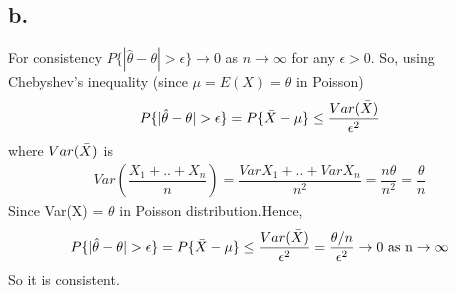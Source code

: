 \documentclass[12pt]{article}
\begin{document}
\subsection*{b.}
For consistency $P\{|\hat{\theta}-\theta|>\epsilon\} \to 0$ as $n \to \infty$ for any $\epsilon > 0$. So, using Chebyshev's inequality (since $\mu = E(X) = \theta$ in Poisson)
\begin{gather*}
    P\{|\hat{\theta}-\theta|>\epsilon\} = P\{\Bar{X}-\mu\} \leq \dfrac{Var(\Bar{X})}{\epsilon^2}
\end{gather*}
where $Var(\Bar{X})$ is 
\begin{gather*}
    Var(\dfrac{X_1+..+X_n}{n}) = \dfrac{VarX_1+..+VarX_n}{n^2} = \dfrac{n\theta}{n^2} = \dfrac{\theta}{n}
\end{gather*}
Since Var(X) = $\theta$ in Poisson distribution.Hence,
\begin{gather*}
    P\{|\hat{\theta}-\theta|>\epsilon\} = P\{\Bar{X}-\mu\} \leq \dfrac{Var(\Bar{X})}{\epsilon^2} = \dfrac{\theta/n}{\epsilon^2} \to 0 \text{ as n}\to \infty
\end{gather*}
So it is consistent.
\end{document}
